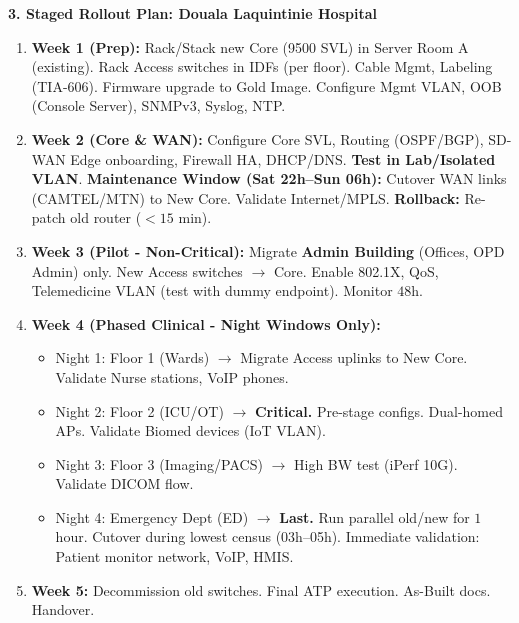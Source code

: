 \documentclass[11pt]{article}
\begin{document}
\begin{exoresolu}
\noindent\textbf{3. Staged Rollout Plan: Douala Laquintinie Hospital}
\begin{enumerate}
    \item \textbf{Week 1 (Prep):} Rack/Stack new Core (9500 SVL) in Server Room A (existing). Rack Access switches in IDFs (per floor). Cable Mgmt, Labeling (TIA-606). Firmware upgrade to Gold Image. Configure Mgmt VLAN, OOB (Console Server), SNMPv3, Syslog, NTP.
    \item \textbf{Week 2 (Core \& WAN):} Configure Core SVL, Routing (OSPF/BGP), SD-WAN Edge onboarding, Firewall HA, DHCP/DNS. \textbf{Test in Lab/Isolated VLAN}. \textbf{Maintenance Window (Sat 22h--Sun 06h):} Cutover WAN links (CAMTEL/MTN) to New Core. Validate Internet/MPLS. \textbf{Rollback:} Re-patch old router ($< 15$ min).
    \item \textbf{Week 3 (Pilot - Non-Critical):} Migrate \textbf{Admin Building} (Offices, OPD Admin) only. New Access switches $\rightarrow$ Core. Enable 802.1X, QoS, Telemedicine VLAN (test with dummy endpoint). Monitor $48$h.
    \item \textbf{Week 4 (Phased Clinical - Night Windows Only):} 
    \begin{itemize}
        \item Night 1: Floor 1 (Wards) $\rightarrow$ Migrate Access uplinks to New Core. Validate Nurse stations, VoIP phones.
        \item Night 2: Floor 2 (ICU/OT) $\rightarrow$ \textbf{Critical.} Pre-stage configs. Dual-homed APs. Validate Biomed devices (IoT VLAN).
        \item Night 3: Floor 3 (Imaging/PACS) $\rightarrow$ High BW test (iPerf 10G). Validate DICOM flow.
        \item Night 4: Emergency Dept (ED) $\rightarrow$ \textbf{Last.} Run parallel old/new for $1$ hour. Cutover during lowest census (03h--05h). Immediate validation: Patient monitor network, VoIP, HMIS.
    \end{itemize}
    \item \textbf{Week 5:} Decommission old switches. Final ATP execution. As-Built docs. Handover.
\end{enumerate}


\end{exoresolu}
\end{document}

